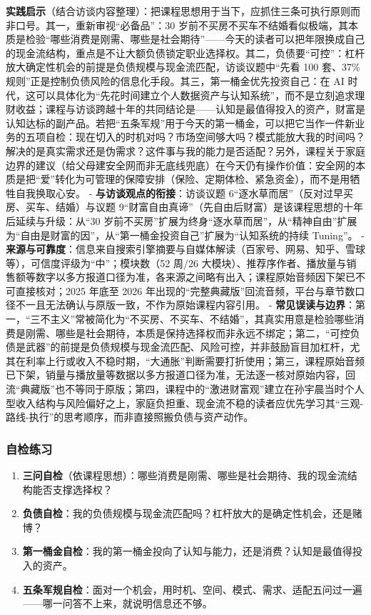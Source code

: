\textbf{实践启示}（结合访谈内容整理）：把课程思想用于当下，应抓住三条可执行原则而非口号。其一，重新审视``必备品''：30
岁前不买房不买车不结婚看似极端，其本质是检验``哪些消费是刚需、哪些是社会期待''------今天的读者可以把年限换成自己的现金流结构，重点是不让大额负债锁定职业选择权。其二，负债要``可控''：杠杆放大确定性机会的前提是负债规模与现金流匹配，访谈议题中``先看
100 套、37\%
规则''正是控制负债风险的信息化手段。其三，第一桶金优先投资自己：在 AI
时代，这可以具体化为``先花时间建立个人数据资产与认知系统''，而不是立刻追求理财收益；课程与访谈跨越十年的共同结论是------认知是最值得投入的资产，财富是认知达标的副产品。若把``五条军规''用于今天的第一桶金，可以把它当作一件新业务的五项自检：现在切入的时机对吗？市场空间够大吗？模式能放大我的时间吗？解决的是真实需求还是伪需求？这件事与我的能力是否适配？另外，课程关于家庭边界的建议（给父母建安全网而非无底线兜底）在今天仍有操作价值：安全网的本质是把``爱''转化为可管理的保障安排（保险、定期体检、紧急资金），而不是用牺牲自我换取心安。
- \textbf{与访谈观点的衔接}：访谈议题
6``逐水草而居''（反对过早买房、买车、结婚）与议题
9``财富自由真谛''（先自由后财富）是该课程思想的十年后延续与升级：从``30
岁前不买房''扩展为终身``逐水草而居''，从``精神自由''扩展为``自由是财富的因''，从``第一桶金投资自己''扩展为``认知系统的持续
Tuning''。 -
\textbf{来源与可靠度}：信息来自搜索引擎摘要与自媒体解读（百家号、网易、知乎、雪球等），可信度评级为``中''；模块数（52
周/26
大模块）、推荐序作者、播放量与销售额等数字以多方报道口径为准，各来源之间略有出入；课程原始音频因下架已不可直接核对；2025
年底至 2026
年出现的``完整典藏版''回流音频，平台与章节数口径不一且无法确认与原版一致，不作为原始课程内容引用。
-
\textbf{常见误读与边界}：第一，``三不主义''常被简化为``不买房、不买车、不结婚''，其真实用意是检验哪些消费是刚需、哪些是社会期待，本质是保持选择权而非永远不绑定；第二，``可控负债是武器''的前提是负债规模与现金流匹配、风险可控，并非鼓励盲目加杠杆，尤其在利率上行或收入不稳时期，``大通胀''判断需要打折使用；第三，课程原始音频已下架，销量与播放量等数据以多方报道口径为准，无法逐一核对原始内容，回流``典藏版''也不等同于原版；第四，课程中的``激进财富观''建立在孙宇晨当时个人型收入结构与风险偏好之上，家庭负担重、现金流不稳的读者应优先学习其``三观-路线-执行''的思考顺序，而非直接照搬负债与资产动作。

\subsubsection{自检练习}

\begin{enumerate}
\def\labelenumi{\arabic{enumi}.}
\tightlist
\item
  \textbf{三问自检}（依课程思想）：哪些消费是刚需、哪些是社会期待、我的现金流结构能否支撑选择权？
\item
  \textbf{负债自检}：我的负债规模与现金流匹配吗？杠杆放大的是确定性机会，还是赌博？
\item
  \textbf{第一桶金自检}：我的第一桶金投向了认知与能力，还是消费？认知是最值得投入的资产。
\item
  \textbf{五条军规自检}：面对一个机会，用时机、空间、模式、需求、适配五问过一遍------哪一问答不上来，就说明信息还不够。
\end{enumerate}

